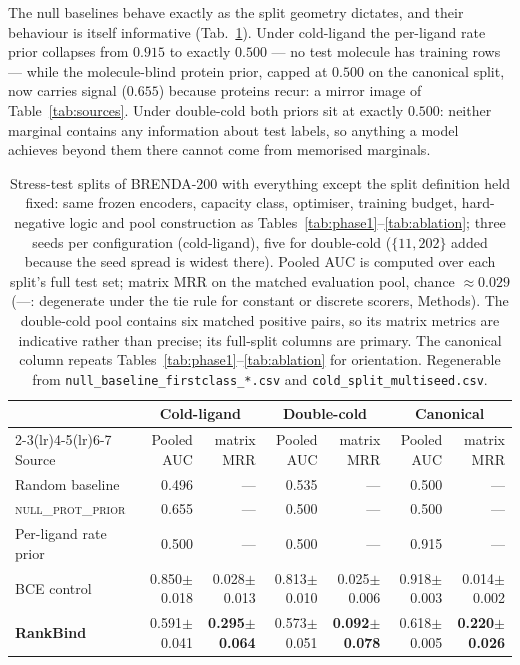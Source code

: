 \documentclass[11pt,a4paper]{article}
\newcommand{\method}{RankBind\xspace}
\newcommand{\nullprior}{\textsc{null\_prot\_prior}\xspace}
\newcommand{\mrr}{matrix MRR}
\begin{document}
The null baselines behave exactly as the split geometry dictates, and their
behaviour is itself informative (Tab.~\ref{tab:cold}). Under cold-ligand
the per-ligand rate prior collapses from $0.915$ to exactly $0.500$ ---
no test molecule has training rows --- while the molecule-blind protein
prior, capped at $0.500$ on the canonical split, now carries signal
($0.655$) because proteins recur: a mirror image of Table~\ref{tab:sources}.
Under double-cold both priors sit at exactly $0.500$: neither marginal
contains any information about test labels, so anything a model achieves
beyond them there cannot come from memorised marginals.

\begin{table}[t]
\centering
\caption{Stress-test splits of BRENDA-200 with everything except the split
definition held fixed: same frozen encoders, capacity class, optimiser,
training budget, hard-negative logic and pool construction as
Tables~\ref{tab:phase1}--\ref{tab:ablation}; three seeds per configuration
(cold-ligand), five for double-cold ($\{11, 202\}$ added because the seed
spread is widest there). Pooled AUC is computed over each split's full test
set; \mrr{} on the matched evaluation pool, chance $\approx 0.029$
(---: degenerate under the tie rule for constant or discrete scorers,
Methods). The double-cold pool contains six matched positive pairs, so its
matrix metrics are indicative rather than precise; its full-split columns
are primary. The canonical column repeats
Tables~\ref{tab:phase1}--\ref{tab:ablation} for orientation. Regenerable
from \texttt{null\_baseline\_firstclass\_*.csv} and
\texttt{cold\_split\_multiseed.csv}.}
\label{tab:cold}
\footnotesize
\setlength{\tabcolsep}{3.5pt}
\begin{tabular}{l rr rr rr}
\toprule
& \multicolumn{2}{c}{Cold-ligand} & \multicolumn{2}{c}{Double-cold} &
  \multicolumn{2}{c}{Canonical} \\
\cmidrule(lr){2-3}\cmidrule(lr){4-5}\cmidrule(lr){6-7}
Source & Pooled AUC & \mrr{} & Pooled AUC & \mrr{} & Pooled AUC & \mrr{} \\
\midrule
Random baseline         & 0.496           & --- & 0.535           & --- & 0.500           & --- \\
\nullprior              & 0.655           & --- & 0.500           & --- & 0.500           & --- \\
Per-ligand rate prior   & 0.500           & --- & 0.500           & --- & 0.915           & --- \\
\midrule
BCE control             & 0.850$\pm$0.018 & 0.028$\pm$0.013 & 0.813$\pm$0.010 & 0.025$\pm$0.006 & 0.918$\pm$0.003 & 0.014$\pm$0.002 \\
\textbf{\method}        & 0.591$\pm$0.041 & \textbf{0.295$\pm$0.064} & 0.573$\pm$0.051 & \textbf{0.092$\pm$0.078} & 0.618$\pm$0.005 & \textbf{0.220$\pm$0.026} \\
\bottomrule
\end{tabular}
\end{table}
\end{document}
